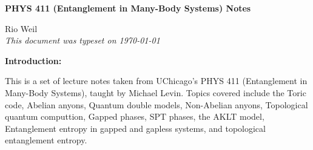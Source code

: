 \documentclass[10pt]{article}
\begin{document}
\begin{tcolorbox}
  \begin{center}
  \begin{Large}
    \textbf{PHYS 411 (Entanglement in Many-Body Systems) Notes} \\
    \vspace{5pt}
  \end{Large}
  \begin{large}
        Rio Weil \\
\vspace{5pt}
    \emph{This document was typeset on \today}
  \end{large}
  \end{center}
\end{tcolorbox}

\begin{center}
  \textbf{Introduction:}

  This is a set of lecture notes taken from UChicago's PHYS 411 (Entanglement in Many-Body Systems), taught by Michael Levin. Topics covered include the Toric code, Abelian anyons, Quantum double models, Non-Abelian anyons, Topological quantum computtion, Gapped phases, SPT phases, the AKLT model, Entanglement entropy in gapped and gapless systems, and topological entanglement entropy. 

\end{center}
\tableofcontents

\newpage

















\end{document}
